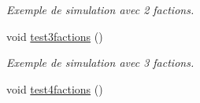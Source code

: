 \begin{DoxyCompactItemize}
\begin{DoxyCompactList}\small\item\em Exemple de simulation avec 2 factions. \end{DoxyCompactList}\item 
\hypertarget{classWorld_aeff7e2c21e886b7a7d5793354644858f}{void \hyperlink{classWorld_aeff7e2c21e886b7a7d5793354644858f}{test3factions} ()}\label{classWorld_aeff7e2c21e886b7a7d5793354644858f}

\begin{DoxyCompactList}\small\item\em Exemple de simulation avec 3 factions. \end{DoxyCompactList}\item 
\hypertarget{classWorld_ae093b6af05143a8faa53db9774eb77ff}{void \hyperlink{classWorld_ae093b6af05143a8faa53db9774eb77ff}{test4factions} ()}\label{classWorld_ae093b6af05143a8faa53db9774eb77ff}


\end{DoxyCompactItemize}
